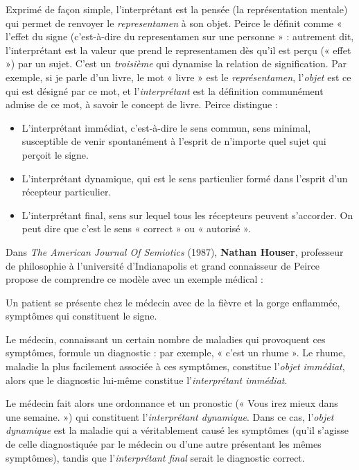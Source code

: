 Exprimé de façon simple, l’interprétant est la pensée (la représentation mentale) qui permet de renvoyer le \textit{representamen} à son objet. Peirce le définit comme « l’effet du signe (c’est-à-dire du representamen sur une personne » : autrement dit, l’interprétant est la valeur que prend le representamen dès qu’il est perçu (« effet ») par un sujet. C’est un \textit{troisième} qui dynamise la relation de signification. Par exemple, si je parle d’un livre, le mot « livre » est le \textit{représentamen}, l’\textit{objet} est ce qui est désigné par ce mot, et l’\textit{interprétant} est la définition communément admise de ce mot, à savoir le concept de livre. Peirce distingue :
\begin{itemize}
\item L’interprétant immédiat, c’est-à-dire le sens commun, sens minimal, susceptible de venir spontanément à l’esprit de n’importe quel sujet qui perçoit le signe.
\item L’interprétant dynamique, qui est le sens particulier formé dans l’esprit d’un récepteur particulier.
\item L’interprétant final, sens sur lequel tous les récepteurs peuvent s’accorder. On peut dire que c’est le sens « correct » ou « autorisé ».
\end{itemize}
Dans \textit{The American Journal Of Semiotics} (1987), \textbf{Nathan Houser}, professeur de philosophie à l’université d’Indianapolis et grand connaisseur de Peirce propose de comprendre ce modèle avec un exemple médical :

Un patient se présente chez le médecin avec de la fièvre et la gorge enflammée, symptômes qui constituent le signe.

Le médecin, connaissant un certain nombre de maladies qui provoquent ces symptômes, formule un diagnostic : par exemple, « c’est un rhume ». Le rhume, maladie la plus facilement associée à ces symptômes, constitue l’\textit{objet immédiat}, alors que le diagnostic lui-même constitue l’\textit{interprétant immédiat}.

Le médecin fait alors une ordonnance et un pronostic (« Vous irez mieux dans une semaine. ») qui constituent l’\textit{interprétant dynamique}. Dans ce cas, l’\textit{objet dynamique} est la maladie qui a véritablement causé les symptômes (qu’il s’agisse de celle diagnostiquée par le médecin ou d’une autre présentant les mêmes symptômes), tandis que l’\textit{interprétant final} serait le diagnostic correct.

